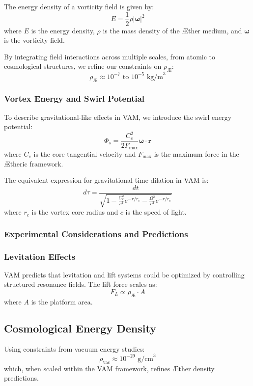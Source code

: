         The energy density of a vorticity field is given by:
        \[ E = \frac{1}{2} \rho |\mathbf{\omega}|^2 \]
        where $E$ is the energy density, $\rho$ is the mass density of the \AE{}ther medium, and $\mathbf{\omega}$ is the vorticity field.

        By integrating field interactions across multiple scales, from atomic to cosmological structures, we refine our constraints on $\rho_\text{\AE}$:
        \[ \rho_\text{\AE} \approx 10^{-7} \text{ to } 10^{-5} \text{ kg/m}^3 \]


        \subsubsection*{Vortex Energy and Swirl Potential}\label{sec:vortex-energy-and-swirl-potential}

        To describe gravitational-like effects in VAM, we introduce the swirl energy potential:
        \[ \Phi_s = \frac{C_e^2}{2F_{\text{max}}} \mathbf{\omega} \cdot \mathbf{r} \]
        where $C_e$ is the core tangential velocity and $F_{\text{max}}$ is the maximum force in the \AE{}theric framework.

        The equivalent expression for gravitational time dilation in VAM is:
        \[ d\tau = \frac{dt}{\sqrt{1 - \frac{C_e^2}{c^2} e^{-r/r_c} - \frac{\Omega^2}{c^2} e^{-r/r_c}}} \]
        where $r_c$ is the vortex core radius and $c$ is the speed of light.


        \subsubsection*{Experimental Considerations and Predictions}\label{sec:experimental-considerations-and-predictions}

        \subsubsection*{Levitation Effects}\label{subsec:levitation-effects}
        VAM predicts that levitation and lift systems could be optimized by controlling structured resonance fields. The lift force scales as:
        \[ F_L \propto \rho_\text{\AE} \cdot A \]
        where $A$ is the platform area.

        \subsection{Cosmological Energy Density}\label{subsec:cosmological-energy-density}
        Using constraints from vacuum energy studies:
        \[ \rho_\text{vac} \approx 10^{-29} \text{ g/cm}^3 \]
        which, when scaled within the VAM framework, refines \AE{}ther density predictions.



